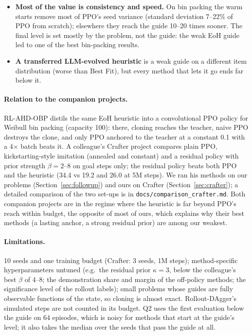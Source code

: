 \documentclass[11pt,a4paper]{article}
\begin{document}
\begin{itemize}[leftmargin=*]
  the Q-filter, which ends it state by state where an on-policy critic prefers the policy's action, keeps the policy
  near the heuristic.
\item \textbf{Most of the value is consistency and speed.} On bin packing the warm starts remove most of PPO's seed
  variance (standard deviation 7--22\% of PPO from scratch); elsewhere they reach the guide 10--20 times sooner. The
  final level is set mostly by the problem, not the guide: the weak EoH guide led to one of the best bin-packing
  results.
\item \textbf{A transferred LLM-evolved heuristic} is a weak guide on a different item distribution (worse than Best
  Fit), but every method that lets it go ends far below it.
\end{itemize}

\paragraph{Relation to the companion projects.} RL-AHD-OBP distils the same EoH heuristic into a convolutional PPO
policy for Weibull bin packing (capacity 100): there, cloning reaches the teacher, naive PPO destroys the clone, and
only PPO anchored to the teacher at a constant 0.1 with a 4$\times$ batch beats it. A colleague's Crafter project
compares plain PPO, kickstarting-style imitation (annealed and constant) and a residual policy with prior strength
$\beta = 2$--8 on goal steps only; the residual policy beats both PPO and the heuristic (34.4 vs 19.2 and 26.0 at 5M
steps). We ran his methods on our problems (Section~\ref{sec:followup}) and ours on Crafter
(Section~\ref{sec:crafter}); a detailed comparison of the two set-ups is in \texttt{docs/comparison\_crafter.md}.
Both companion projects are in the regime where the heuristic is far beyond PPO's reach within budget, the opposite of
most of ours, which explains why their best methods (a lasting anchor, a strong residual prior) are among our weakest.

\paragraph{Limitations.} 10 seeds and one training budget (Crafter: 3 seeds, 1M steps); method-specific hyperparameters untuned (e.g.\ the
residual prior $\kappa = 3$, below the colleague's best $\beta$ of 4--8; the demonstration share and margin of the
off-policy methods; the significance level of the rollout labels); small problems whose guides are fully observable
functions of the state, so cloning is almost exact. Rollout-DAgger's simulated steps are not counted in its budget.
Q2 uses the first evaluation below the guide on 64 episodes, which is noisy for methods that start at the guide's
level; it also takes the median over the seeds that pass the guide at all.
\end{document}
